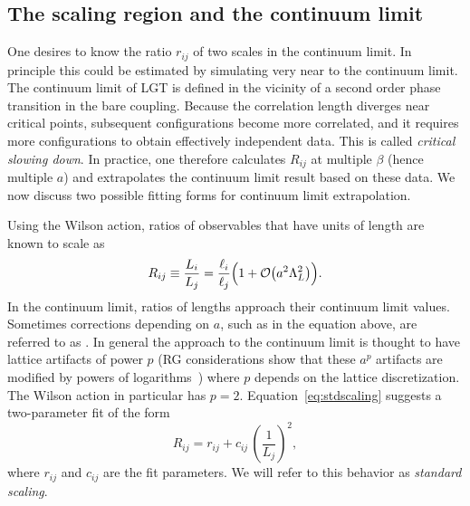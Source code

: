 \subsection{The scaling region and the continuum limit}
\label{sec:sysa}


One desires to know the ratio $r_{ij}$ of two scales in
the continuum limit. In principle this could be estimated by simulating
very near to the continuum limit. 
The continuum limit of LGT is defined in the vicinity of a second order
phase transition in the bare coupling. Because the correlation length
diverges near critical points, subsequent configurations become more
correlated, and it requires more configurations to obtain effectively
independent data. This is called {\it critical slowing down}. 
In practice, one therefore calculates
$R_{ij}$ at multiple $\beta$ (hence multiple $a$) and extrapolates
the continuum limit result based on these data. We now discuss
two possible fitting forms for continuum limit extrapolation. 

Using the Wilson action, ratios of observables that have
units of length are known to scale as 
\begin{equation}\label{eq:stdscaling}
  R_{ij}\equiv\frac{L_i}{L_j}=\frac{\ell_i}{\ell_j}\Big(1+
                     \order{a^2\Lambda_L^2}\Big).
\end{equation}
In the continuum limit, ratios
of lengths approach their continuum limit values.
Sometimes corrections depending on $a$, such as in the equation above, are
referred to as . 
In general the approach to the
continuum limit is thought to have lattice artifacts of power $p$
(RG considerations show that these $a^p$ artifacts are modified by
powers of logarithms~\cite{montvay_quantum_1994}) where $p$ 
depends on the lattice discretization.
The Wilson action in particular has $p=2$.
Equation~\eqref{eq:stdscaling} suggests a two-parameter fit of the form
\begin{equation}\label{eq:stdscalingfit}
  R_{ij}=r_{ij}+c_{ij}\,\left(\frac{1}{L_j}\right)^2,
\end{equation}
where $r_{ij}$ and $c_{ij}$ are the 
fit parameters. We will refer to this behavior 
as {\it standard scaling}. 


